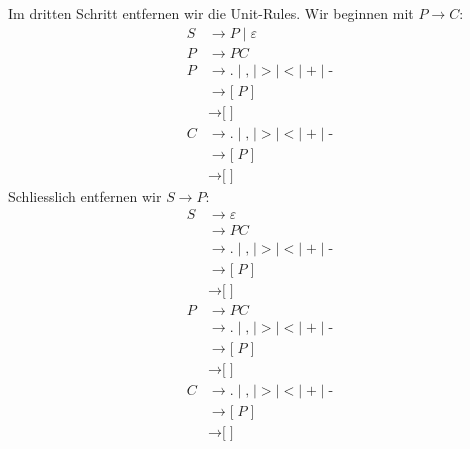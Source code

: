\begin{loesung}
Im dritten Schritt entfernen wir die Unit-Rules.
Wir beginnen mit $P\to C$:
\begin{align*}
S&\rightarrow P
\mid \varepsilon
\\
P&\rightarrow P C
\\
P&\rightarrow
\texttt{.} \mid 
\texttt{,} \mid 
\texttt{>} \mid 
\texttt{<} \mid 
\texttt{+} \mid 
\texttt{-}
\\
&\rightarrow \texttt{[} \; P \; \texttt{]}
\\
&\rightarrow \texttt{[} \; \texttt{]}
\\
C&\rightarrow
\texttt{.} \mid 
\texttt{,} \mid 
\texttt{>} \mid 
\texttt{<} \mid 
\texttt{+} \mid 
\texttt{-}
\\
&\rightarrow \texttt{[} \; P \; \texttt{]}
\\
&\rightarrow \texttt{[} \; \texttt{]}
\end{align*}
Schliesslich entfernen wir $S\to P$:
\begin{align*}
S&\rightarrow\varepsilon
\\
&\rightarrow P C
\\
&\rightarrow
\texttt{.} \mid 
\texttt{,} \mid 
\texttt{>} \mid 
\texttt{<} \mid 
\texttt{+} \mid 
\texttt{-}
\\
&\rightarrow \texttt{[} \; P \; \texttt{]}
\\
&\rightarrow \texttt{[} \; \texttt{]}
\\
P&\rightarrow P C
\\
&\rightarrow
\texttt{.} \mid 
\texttt{,} \mid 
\texttt{>} \mid 
\texttt{<} \mid 
\texttt{+} \mid 
\texttt{-}
\\
&\rightarrow \texttt{[} \; P \; \texttt{]}
\\
&\rightarrow \texttt{[} \; \texttt{]}
\\
C&\rightarrow
\texttt{.} \mid 
\texttt{,} \mid 
\texttt{>} \mid 
\texttt{<} \mid 
\texttt{+} \mid 
\texttt{-}
\\
&\rightarrow \texttt{[} \; P \; \texttt{]}
\\
&\rightarrow \texttt{[} \; \texttt{]}
\end{align*}


\end{loesung}
